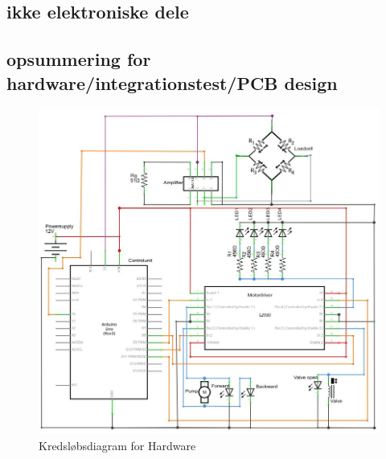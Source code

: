  
 
\subsection{ikke elektroniske dele}
 
 
\subsection{opsummering for hardware/integrationstest/PCB design} 

\begin{figure}[H]
	\centering
	\includegraphics[width=1\textwidth]{billeder/Hardware/diagrammer/HWdiagram.JPG}
	\caption{Kredsløbsdiagram for Hardware}
	\label{fig:HWdiagram}
\end{figure}


 